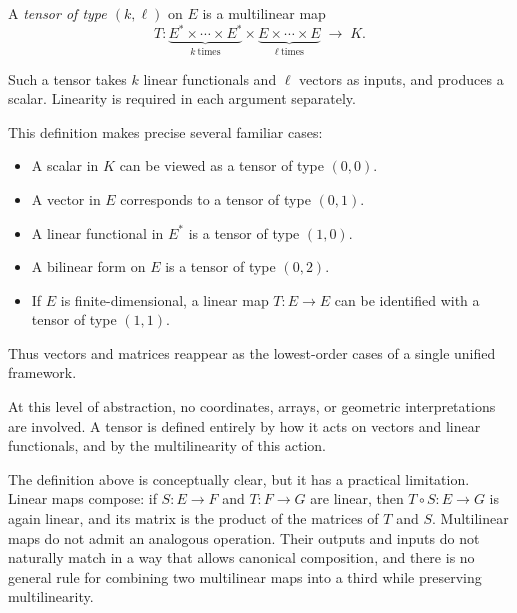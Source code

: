 \begin{definition}
A \emph{tensor of type \((k,\ell)\)} on \(E\) is a multilinear map
\[
T : \underbrace{E^* \times \cdots \times E^*}_{k\ \text{times}}
\times
\underbrace{E \times \cdots \times E}_{\ell\ \text{times}}
\;\longrightarrow\; K.
\]
\end{definition}

Such a tensor takes \(k\) linear functionals and \(\ell\) vectors as inputs,
and produces a scalar.
Linearity is required in each argument separately.

\medskip

This definition makes precise several familiar cases:
\begin{itemize}
\item A scalar in \(K\) can be viewed as a tensor of type \((0,0)\).
\item A vector in \(E\) corresponds to a tensor of type \((0,1)\).
\item A linear functional in \(E^*\) is a tensor of type \((1,0)\).
\item A bilinear form on \(E\) is a tensor of type \((0,2)\).
\item If $E$ is finite-dimensional, a linear map $T : E \to E$ can be identified
      with a tensor of type $(1,1)$.
\end{itemize}

Thus vectors and matrices reappear as the lowest-order cases of a single
unified framework.

\medskip

At this level of abstraction, no coordinates, arrays, or geometric interpretations
are involved.
A tensor is defined entirely by how it acts on vectors and linear functionals,
and by the multilinearity of this action.


\medskip

The definition above is conceptually clear, but it has a practical limitation.
Linear maps compose: if $S : E \to F$ and $T : F \to G$ are linear, then
$T \circ S : E \to G$ is again linear, and its matrix is the product of the
matrices of $T$ and $S$.
Multilinear maps do not admit an analogous operation.
Their outputs and inputs do not naturally match in a way that allows canonical
composition, and there is no general rule for combining two multilinear maps
into a third while preserving multilinearity.


